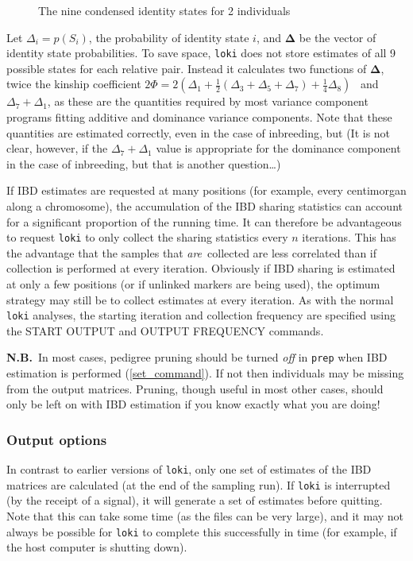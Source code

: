 \documentclass[10pt,a4paper]{article}
\newcommand{\Prep}{\texttt{prep}\xspace}
\newcommand{\Loki}{\texttt{loki}\xspace}
\begin{document}
\begin{figure}
\begin{center}
\end{center}
\caption{\label{fig:3}
The nine condensed identity states for 2 individuals}
\end{figure}

Let $\Delta_i=p(S_i)$, the probability of identity state $i$, and
$\boldsymbol{\Delta}$ be the vector of identity state probabilities. To save
space, \Loki does not store estimates of all 9 possible states for each
relative pair.  Instead it calculates two functions of
$\boldsymbol{\Delta}$, twice the kinship coefficient
$2\Phi=2(\Delta_1+\frac{1}{2}(\Delta_3+\Delta_5+\Delta_7)+\frac{1}{4}\Delta_8)$
\ and $\Delta_7+\Delta_1$, as these are the quantities required by most
variance component programs fitting additive and dominance variance
components. Note that these quantities are estimated correctly, even in the
case of inbreeding, but (It is not clear, however, if the
$\Delta_7+\Delta_1$ value is appropriate for the dominance component
in the case of inbreeding, but that is another question{\ldots})

If IBD estimates are requested at many positions (for example, every
centimorgan along a chromosome), the accumulation of the IBD sharing
statistics can account for a significant proportion of the running time.  It
can therefore be advantageous to request \Loki to only collect the sharing
statistics every $n$ iterations.  This has the advantage that the samples
that \textit{are}\ collected are less correlated than if collection is
performed at every iteration.  Obviously if IBD sharing is estimated at only
a few positions (or if unlinked markers are being used), the optimum
strategy may still be to collect estimates at every iteration.  As with
the normal \Loki analyses, the starting iteration and collection frequency
are specified using the START OUTPUT and OUTPUT FREQUENCY commands.

\textbf{N.B.}\ In most cases, pedigree pruning should be turned \emph{off}
in \Prep when IBD estimation is performed (\ref{set_command}).  If not then
individuals may be missing from the output matrices.  Pruning, though useful
in most other cases, should only be left on with IBD estimation if you know
exactly what you are doing!

\subsubsection{Output options}
In contrast to earlier versions of \Loki, only one set of estimates of the IBD
matrices are calculated (at the end of the sampling run).  If \Loki is
interrupted (by the receipt of a signal), it will generate a set of
estimates before quitting.  Note that this can take some time (as the files
can be very large), and it may not always be possible for \Loki to complete
this successfully in time (for example, if the host computer is shutting
down).
\end{document}
